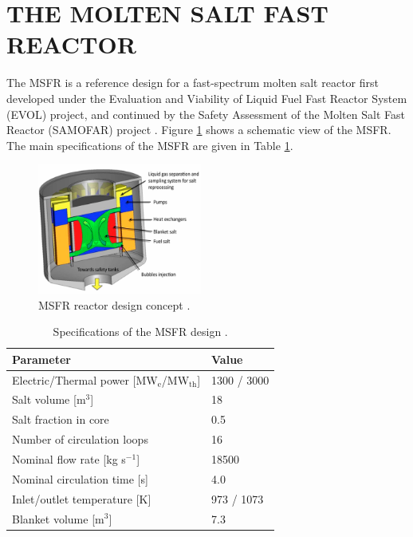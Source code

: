\documentclass{anstrans}
\begin{document}

\section{THE MOLTEN SALT FAST REACTOR}

The MSFR is a reference design for a fast-spectrum molten salt reactor first developed under the Evaluation and Viability of Liquid Fuel Fast Reactor System (EVOL) project, and continued by the Safety Assessment of the Molten Salt Fast Reactor (SAMOFAR) project \cite{serp_molten_2014}. Figure \ref{fig:msfr} shows a schematic view of the MSFR. The main specifications of the MSFR are given in Table \ref{table:msfr}.

\begin{figure}[t] 
	\centering
	\includegraphics[width=0.48\textwidth]{./figures/MSFR}
	\caption{MSFR reactor design concept \cite{serp_molten_2014}.}
	\label{fig:msfr}
\end{figure} 

\begin{table}
\begin{tabular}{ l l }
\hline
Parameter & Value \\
\hline
Electric/Thermal power [MW$_{\text{e}}$/MW$_{\text{th}}$] & 1300 / 3000  \\
Salt volume [m$^3$] & 18 \\
Salt fraction in core & 0.5 \\
Number of circulation loops & 16 \\
Nominal flow rate [kg s$^{-1}$] & 18500  \\
Nominal circulation time [s] & 4.0 \\
Inlet/outlet temperature [K] & 973 / 1073 \\
Blanket volume [m$^3$] & 7.3\\
\hline
\end{tabular}
\caption{Specifications of the MSFR design \cite{serp_molten_2014}.}
\label{table:msfr}
\end{table}
\end{document}
